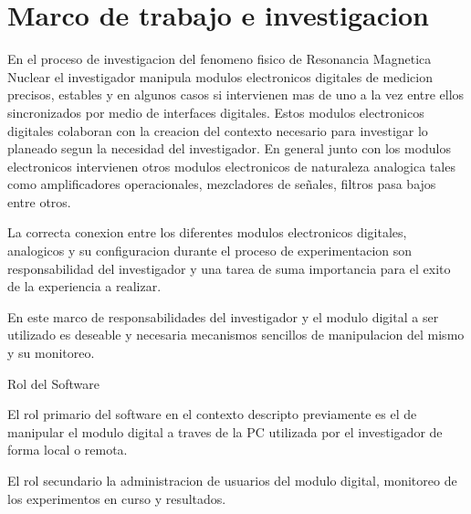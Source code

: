 \section{Marco de trabajo e investigacion}

En el proceso de investigacion del fenomeno fisico de Resonancia Magnetica Nuclear el investigador manipula modulos 
electronicos digitales de medicion precisos, estables y en algunos casos si intervienen mas de uno a la vez entre ellos sincronizados 
por medio de interfaces digitales. Estos modulos electronicos digitales colaboran con la creacion del contexto necesario para investigar lo planeado 
segun la necesidad del investigador. En general junto con los modulos electronicos intervienen otros modulos electronicos de naturaleza analogica
tales como amplificadores operacionales, mezcladores de señales, filtros pasa bajos entre otros.

La correcta conexion entre los diferentes modulos electronicos digitales, analogicos y su configuracion durante el proceso de experimentacion
son responsabilidad del investigador y una tarea de suma importancia para el exito de la experiencia a realizar.

En este marco de responsabilidades del investigador y el modulo digital a ser utilizado es deseable y necesaria mecanismos sencillos de manipulacion
del mismo y su monitoreo.

Rol del Software

El rol primario del software en el contexto descripto previamente es el de manipular el modulo digital a traves de la PC utilizada por el investigador 
de forma local o remota.

El rol secundario la administracion de usuarios del modulo digital, monitoreo de los experimentos en curso y resultados.

